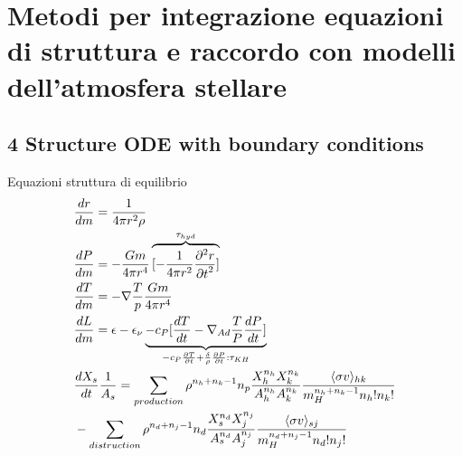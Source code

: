 \section{Metodi per integrazione equazioni di struttura e raccordo con modelli dell'atmosfera stellare}

\subsection{4 Structure ODE with boundary conditions}

\begin{frame}{Equazioni struttura di equilibrio}
\begin{align*}
&\TDy{m}{r}=\frac{1}{4\pi r^2\rho}\\
&\TDy{m}{P}=-\frac{Gm}{4\pi r^4}\overbrace{[-\frac{1}{4\pi r^2}\PtwoDy{t}{r}]}^{\tau_{hyd}}\\
&\TDy{m}{T}=-\nabla\frac{T}{p}\frac{Gm}{4\pi r^4}\\
&\TDy{m}{L}=\epsilon-\epsilon_{\nu} \underbrace{-c_P[\TDy{t}{T}-\nad\frac{T}{P}\TDy{t}{P}]}_{-c_P\PDy{t}{T}+\frac{\delta}{\rho}\PDy{t}{P}: \tkh}\\
&\TDy{t}{X_s}\frac{1}{A_s}=\sum_{production}\rho^{n_h+n_k-1}n_p\frac{X_h^{n_h}X_k^{n_k}}{A_h^{n_h}A_k^{n_k}}\frac{\exv{\sigma v}_{hk}}{m_H^{n_h+n_k-1}n_h!n_k!}\\
&-\sum_{distruction}\rho^{n_d+n_j-1}n_d\frac{X_s^{n_d}X_j^{n_j}}{A_s^{n_d}A_j^{n_j}}\frac{\exv{\sigma v}_{sj}}{m_H^{n_d+n_j-1}n_d!n_j!}
\end{align*}
\end{frame}


